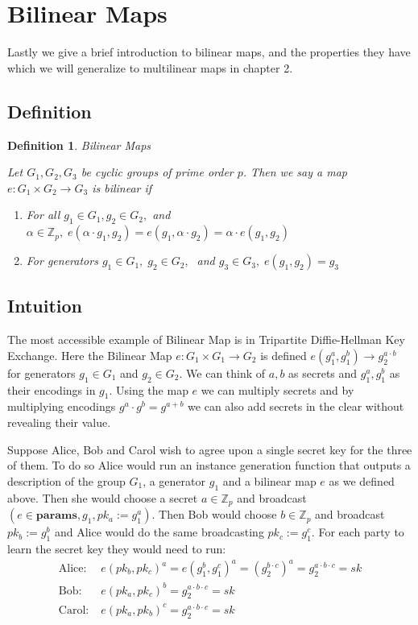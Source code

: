 \documentclass[12pt,twoside]{reedthesis}
\newtheorem{definition}{Definition}
\newcommand{\Z}[0]{\mathbb{Z}}
\begin{document}
    
    \section{Bilinear Maps}
    
    Lastly we give a brief introduction to bilinear maps, and the properties they have which we will generalize to multilinear maps in chapter 2. 
    
    \subsection{Definition}
    
    \begin{definition}{Bilinear Maps}
    \par Let $G_1,G_2,G_3$ be cyclic groups of prime order $p$. Then we say a map $e:G_1 \times G_2 \rightarrow G_3$ is bilinear if
    
    \begin{enumerate}
    \item For all $g_1 \in G_1, g_2\in G_2,$ and $ \alpha \in \Z_p, \; e(\alpha\cdot g_1,g_2) =e( g_1,\alpha\cdot g_2) = \alpha\cdot e(g_1,g_2) $
    \item For generators $g_1\in G_1, \; g_2 \in G_2, \;$ and $g_3 \in G_3,\; e(g_1,g_2) = g_3$     \end{enumerate}    
    \end{definition}
    
    \subsection{Intuition}
    \newcommand{\params}[0]{\textbf{params}}
    The most accessible example of Bilinear Map is in Tripartite Diffie-Hellman Key Exchange. Here the Bilinear Map $e:G_1 \times G_1 \rightarrow G_2$ is defined $e(g_1^a,g_1^b) \rightarrow g_2^{a\cdot b}$ for generators $g_1\in G_1$ and $g_2 \in G_2$. We can think of $a,b$ as secrets and $g_1^a,g_1^b$ as their encodings in $g_1$. Using the map $e$ we can multiply secrets and by multiplying encodings $g^a\cdot g^b = g^{a+b}$ we can also add secrets in the clear without revealing their value.
\par Suppose Alice, Bob and Carol wish to agree upon a single secret key for the three of them. To do so Alice would run an instance generation function that outputs a description of the group $G_1$, a generator $g_1$ and a bilinear map $e$ as we defined above. Then she would choose a secret $a \in \Z_p$ and broadcast $(e \in \params, g_1, pk_a := g_1^a)$. Then Bob would choose $b\in \Z_p$ and broadcast $pk_b := g_1^b$ and Alice would do the same broadcasting $pk_c := g_1^c$. For each party to learn the secret key they would need to run:
\begin{align*}
\text{Alice:} & \; e(pk_b,pk_c)^a = e(g_1^b,g_1^c)^a = ( g_2^{b\cdot c} )^a = g_2^{a\cdot b \cdot c} = sk\\
\text{Bob:} &\; e(pk_a,pk_c)^b = g_2^{a \cdot b \cdot c} = sk \\
\text{Carol:}& \; e(pk_a,pk_b)^c = g_2^{a \cdot b \cdot c} = sk
\end{align*}
\end{document}
